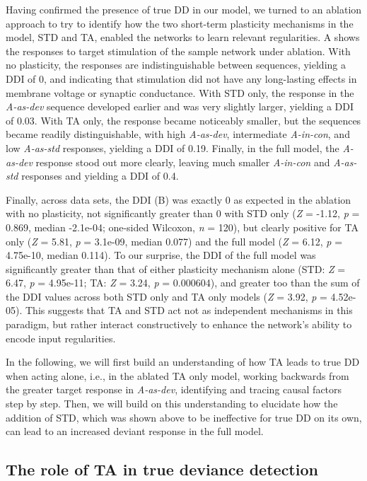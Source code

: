 \documentclass[9pt,lineno,onehalfspacing]{elife}
\newcommand{\dev}{\textit{A-as-dev}}
\newcommand{\msc}{\textit{A-in-con}}
\newcommand{\std}{\textit{A-as-std}}
\begin{document}
Having confirmed the presence of true DD in our model, we turned to an ablation approach to try to identify how the two short-term plasticity mechanisms in the model, STD and TA, enabled the networks to learn relevant regularities. A shows the responses to target stimulation of the sample network under ablation. With no plasticity, the responses are indistinguishable between sequences, yielding a DDI of 0, and indicating that stimulation did not have any long-lasting effects in membrane voltage or synaptic conductance. With STD only, the response in the \dev{} sequence developed earlier and was very slightly larger, yielding a DDI of 0.03. With TA only, the response became noticeably smaller, but the sequences became readily distinguishable, with high \dev{}, intermediate \msc{}, and low \std{} responses, yielding a DDI of 0.19. Finally, in the full model, the \dev{} response stood out more clearly, leaving much smaller \msc{} and \std{} responses and yielding a DDI of 0.4.

Finally, across data sets, the DDI (B) was exactly 0 as expected in the ablation with no plasticity, not significantly greater than 0 with STD only (\textit{Z} = -1.12, \textit{p} = 0.869, median -2.1e-04; one-sided Wilcoxon, \textit{n} = 120), but clearly positive for TA only (\textit{Z} = 5.81, \textit{p} = 3.1e-09, median 0.077) and the full model (\textit{Z} = 6.12, \textit{p} = 4.75e-10, median 0.114). To our surprise, the DDI of the full model was significantly greater than that of either plasticity mechanism alone (STD: \textit{Z} = 6.47, \textit{p} = 4.95e-11; TA: \textit{Z} = 3.24, \textit{p} = 0.000604), and greater too than the sum of the DDI values across both STD only and TA only models (\textit{Z} = 3.92, \textit{p} = 4.52e-05). This suggests that TA and STD act not as independent mechanisms in this paradigm, but rather interact constructively to enhance the network's ability to encode input regularities.

In the following, we will first build an understanding of how TA leads to true DD when acting alone, i.e., in the ablated TA only model, working backwards from the greater target response in \dev{}, identifying and tracing causal factors step by step. Then, we will build on this understanding to elucidate how the addition of STD, which was shown above to be ineffective for true DD on its own, can lead to an increased deviant response in the full model.

\subsection{The role of TA in true deviance detection}\label{sec:ta}
\end{document}
